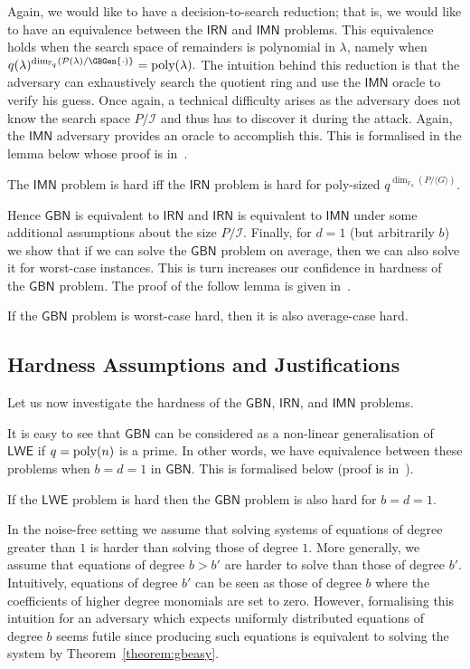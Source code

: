 \documentclass[draft]{llncs}
\newcommand{\heading}[1]{{\vspace{6pt}\noindent\sc{#1.}}}
\newcommand{\ring}[1]{\mathbb{#1}}
\newcommand{\F}{\ensuremath{\ring{F}}\xspace}
\newcommand{\ideal}[1]{\ensuremath{\langle #1 \rangle}\xspace}
\newcommand{\I}{\ensuremath{\mathcal{I}}\xspace}
\newcommand{\GBN}{\ensuremath{\mathsf{GBN}}\xspace}
\newcommand{\IRN}{\ensuremath{\mathsf{IRN}}\xspace}
\newcommand{\IMN}{\ensuremath{\mathsf{IMN}}\xspace}
\newcommand{\LWE}{\ensuremath{\mathsf{LWE}}\xspace}
\newcommand{\secpar}{\lambda}
\newcommand{\poly}[1]{\ensuremath{\mathrm{poly}(#1)}\xspace}
\begin{document}
Again, we would like to have a decision-to-search reduction; that is, we would like to have an equivalence between the \IRN and \IMN problems. This equivalence holds when the search space of remainders is polynomial in $\secpar$, namely when 
$
q(\secpar)^{\dim_{\F_q}(\mathcal{P}(\secpar)/\GBGen{\cdot)}}=\poly{\secpar}.
$ 
The intuition behind this reduction is that the adversary can exhaustively search the quotient ring and use the \IMN oracle to verify his guess. Once again, a technical difficulty arises as the adversary does not know the search space $P/\I$ and thus has to discover it during the attack. Again, the \IMN adversary provides an oracle to accomplish this. This is formalised in the lemma below whose proof is in~\cite{full}.
\begin{lemma}
The \IMN problem is hard iff the \IRN problem is hard for poly-sized $q^{\dim_{\F_q}(P/\ideal{G})}$.
\label{lem:IMN=IRN}
\end{lemma}
Hence \GBN is equivalent to \IRN and \IRN is equivalent to \IMN under some additional assumptions about the size $P/\I$. Finally, for $d=1$ (but arbitrarily $b$) we show that if we can solve the \GBN problem on average, then we can also solve it for worst-case instances. This is turn increases our confidence in hardness of the \GBN problem. The proof of the follow lemma is given in~\cite{full}.
\begin{lemma}
If the \GBN problem is worst-case hard, then it is also average-case hard. 
\end{lemma}

\vspace{-4mm} \subsection{Hardness Assumptions and Justifications} \vspace{-2mm}
\label{sec:noisy:hard}
Let us now investigate the hardness of the \GBN, \IRN, and \IMN problems. 

\heading{Relation to LWE}
It is easy to see that \GBN can be considered as a non-linear generalisation of \LWE if $q={\rm poly}(n)$ is a prime. In other words, we have equivalence between these problems when $b = d = 1$ in \GBN. This is formalised below (proof is in~\cite{full}).

\begin{lemma}
If the \LWE problem is hard then the \GBN problem is also hard for $b=d=1$.
\label{lem:GBN=LWE}
\end{lemma}
In the noise-free setting we assume that solving systems of equations of degree greater than $1$ is harder than solving those of degree $1$. More generally, we assume that equations of degree $b>b'$ are harder to solve than those of degree $b'$. Intuitively, equations of degree $b'$ can be seen as those of degree $b$ where the coefficients of higher degree monomials are set to zero. However, formalising this intuition for an adversary which expects uniformly distributed equations of degree $b$ seems futile since producing such equations is equivalent to solving the system by Theorem~\ref{theorem:gbeasy}.
\end{document}
